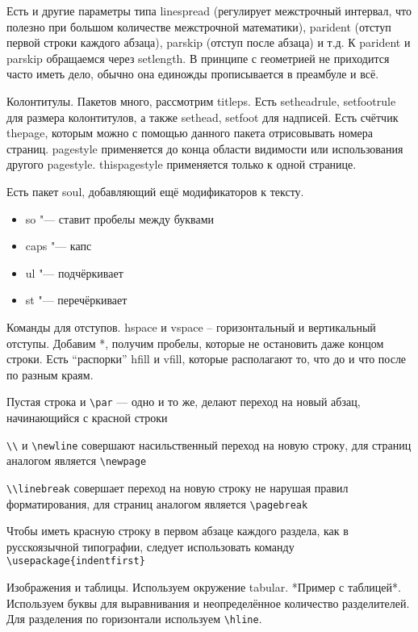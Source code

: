 \documentclass[a4paper, 12pt]{article}
\begin{document}
Есть и другие параметры типа linespread (регулирует межстрочный интервал, что полезно при большом количестве межстрочной математики), parident (отступ первой строки каждого абзаца), parskip (отступ после абзаца) и т.д. К parident и parskip обращаемся через setlength. В принципе с геометрией не приходится часто иметь дело, обычно она единожды прописывается в преамбуле и всё. 

Колонтитулы. Пакетов много, рассмотрим titleps. Есть setheadrule, setfootrule для размера колонтитулов, а также sethead, setfoot для надписей. Есть счётчик thepage, которым можно с помощью данного пакета отрисовывать номера страниц. pagestyle применяется до конца области видимости или использования другого pagestyle. thispagestyle применяется только к одной странице.

Есть пакет soul, добавляющий ещё модификаторов к тексту. 
\begin{itemize}
	\item  so "--- ставит пробелы между буквами
	\item caps "--- капс
	\item ul "--- подчёркивает
	\item st "--- перечёркивает
\end{itemize}
Команды для отступов. hspace и vspace – горизонтальный и вертикальный отступы. Добавим *, получим пробелы, которые не остановить даже концом строки. Есть “распорки” hfill и vfill, которые располагают то, что до и что после по разным краям.

Пустая строка и \verb|\par| --- одно и то же, делают переход на новый абзац, начинающийся с красной строки

\verb|\\| и \verb|\newline| совершают насильственный переход на новую строку, для страниц аналогом является \verb|\newpage|

\verb|\\linebreak| совершает переход на новую строку не нарушая правил форматирования, для страниц аналогом является \verb|\pagebreak|

Чтобы иметь красную строку в первом абзаце каждого раздела, как в русскоязычной типографии, следует использовать команду \verb|\usepackage{indentfirst}|

Изображения и таблицы. Используем окружение tabular. *Пример с таблицей*. Используем буквы для выравнивания и неопределённое количество разделителей. Для разделения по горизонтали используем \verb|\hline|.
\end{document}
